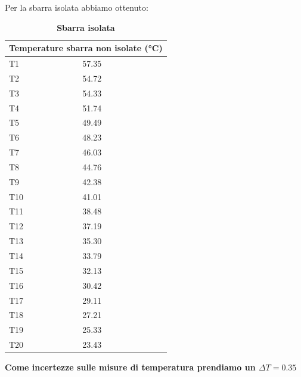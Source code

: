 \documentclass[a4paper,10pt]{article}
\begin{document}
Per la sbarra isolata abbiamo ottenuto:
\begin{table}[H]
\centering
\caption{\textbf{Sbarra isolata}}
\label{my-label}
\begin{tabular}{|l|l|}
\hline
\multicolumn{2}{|l|}{Temperature sbarra non isolate (°C)} \\ \hline
T1                         & 57.35                        \\ \hline
T2                         & 54.72                        \\ \hline
T3                         & 54.33                        \\ \hline
T4                         & 51.74                        \\ \hline
T5                         & 49.49                        \\ \hline
T6                         & 48.23                        \\ \hline
T7                         & 46.03                        \\ \hline
T8                         & 44.76                        \\ \hline
T9                         & 42.38                        \\ \hline
T10                        & 41.01                        \\ \hline
T11                        & 38.48                        \\ \hline
T12                        & 37.19                        \\ \hline
T13                        & 35.30                        \\ \hline
T14                        & 33.79                        \\ \hline
T15                        & 32.13                        \\ \hline
T16                        & 30.42                        \\ \hline
T17                        & 29.11                        \\ \hline
T18                        & 27.21                        \\ \hline
T19                        & 25.33                        \\ \hline
T20                        & 23.43                        \\ \hline
\end{tabular}
\end{table}
\textbf{\large Come incertezze sulle misure di temperatura prendiamo un $\Delta T= 0.35$ \textcelsius}
\end{document}
